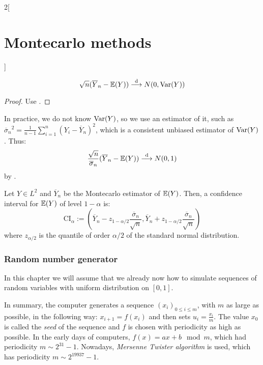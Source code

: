 \documentclass[../../../main_math.tex]{subfiles}
\begin{document}
\begin{multicols}{2}[\section{Montecarlo methods}]
\begin{lemma}
    $$
      \sqrt{n}(\overline{Y}_n - \mathbb{E}(Y))\overset{\text{d}}{\longrightarrow}N(0,\mathrm{Var}(Y))
    $$
  \end{lemma}
  \begin{proof}
    Use .
  \end{proof}
  \begin{remark}
    In practice, we do not know $\mathrm{Var}(Y)$, so we use an estimator of it, such as ${\overline{\sigma}_n}^2=\frac{1}{n-1}\sum_{i=1}^n {(Y_i-\overline{Y}_n)}^2$, which is a consistent unbiased estimator of $\mathrm{Var}(Y)$. Thus:
    $$
      \frac{\sqrt{n}}{\overline{\sigma}_n}(\overline{Y}_n - \mathbb{E}(Y))\overset{\text{d}}{\longrightarrow}N(0,1)
    $$
    by .
  \end{remark}
  \begin{lemma}
    Let $Y\in L^2$ and $\overline{Y}_n$ be the Montecarlo estimator of $\mathbb{E}(Y)$. Then, a confidence interval for $\mathbb{E}(Y)$ of level $1-\alpha$ is:
    $$
      \text{CI}_\alpha:=\left(\overline{Y}_n-z_{1-\alpha/2}\frac{\overline{\sigma}_n}{\sqrt{n}},\overline{Y}_n+z_{1-\alpha/2}\frac{\overline{\sigma}_n}{\sqrt{n}}\right)
    $$
    where $z_{\alpha/2}$ is the quantile of order $\alpha/2$ of the standard normal distribution.
  \end{lemma}
  \subsubsection{Random number generator}
  In this chapter we will assume that we already now how to simulate sequences of \iid random variables with uniform distribution on $[0,1]$.
  \begin{remark}
    In summary, the computer generates a sequence ${(x_i)}_{0\leq i\leq m}$, with $m$ as large as possible, in the following way: $x_{i+1}=f(x_i)$ and then sets $u_i=\frac{x_i}{m}$. The value $x_0$ is called the \emph{seed} of the sequence and $f$ is chosen with periodicity as high as possible. In the early days of computers, $f(x)=ax+b\mod{m}$, which had periodicity $m\sim 2^{31}-1$. Nowadays, \emph{Mersenne Twister algorithm} is used, which has periodicity $m\sim 2^{19937}-1$.
  \end{remark}

\end{multicols}
\end{document}
